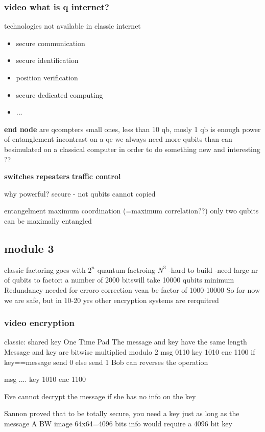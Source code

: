 \subsubsection*{video what is q internet?}
technologies not available in classic internet
\begin{itemize}
\item secure communication
\item secure identification
\item position verification
\item secure dedicated computing
\item ...
\end{itemize}
\textbf{end node} are qcompters small ones, less than 10 qb, mosly 1 qb is enough
power of entanglement
incontrast on a qc we always need more qubits than can besimulated on a classical computer in order to do something new and interesting ??

\textbf{switches}
\textbf{repeaters}
\textbf{traffic control}

why powerful?
secure - not qubits cannot copied

entangelment
maximum coordination (=maximum correlation??)
only two qubits can be maximally entangled

\subsection*{module 3}
classic factoring goes with $2^n$ 
quantum factroing $N^3$
-hard to build
-need large nr of qubits to factor: a number of 2000 bitswill take 10000 qubits minimum
Redundancy needed for erroro correction vcan be factor of 1000-10000
So for now we are safe, but in 10-20 yrs other encryption systems are rerquitred


\subsubsection*{video encryption}
classic: shared key
One Time Pad
The message and key have the same length
Message and key are bitwise multiplied modulo 2
msg 0110
key 1010
enc 1100
if key==message send 0 else send 1
Bob can reverses the operation

msg ....
key 1010
enc 1100

Eve cannot decrypt the message if she has no info on the key


Sannon proved that to be totally secure, you need a key just as long as the message
A BW image 64x64=4096 bits info would require a 4096 bit key

